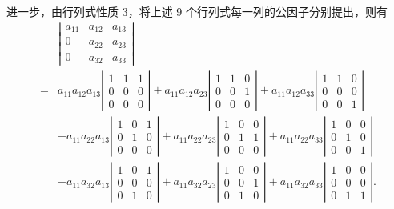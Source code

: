 \documentclass[UTF8,12pt,a4paper,fontset=fandol]{ctexart}
\begin{document}
进一步，由行列式性质 3，将上述 9 个行列式每一列的公因子分别提出，则有
\[
\begin{aligned}
&\left|\begin{array}{ccc}
a_{11} & a_{12} & a_{13}\\
0 & a_{22} & a_{23}\\
0 & a_{32} & a_{33}
\end{array}\right|\\
={}&
a_{11}a_{12}a_{13}\left|\begin{array}{ccc}1&1&1\\0&0&0\\0&0&0\end{array}\right|
+a_{11}a_{12}a_{23}\left|\begin{array}{ccc}1&1&0\\0&0&1\\0&0&0\end{array}\right|
+a_{11}a_{12}a_{33}\left|\begin{array}{ccc}1&1&0\\0&0&0\\0&0&1\end{array}\right|\\
&+a_{11}a_{22}a_{13}\left|\begin{array}{ccc}1&0&1\\0&1&0\\0&0&0\end{array}\right|
+a_{11}a_{22}a_{23}\left|\begin{array}{ccc}1&0&0\\0&1&1\\0&0&0\end{array}\right|
+a_{11}a_{22}a_{33}\left|\begin{array}{ccc}1&0&0\\0&1&0\\0&0&1\end{array}\right|\\
&+a_{11}a_{32}a_{13}\left|\begin{array}{ccc}1&0&1\\0&0&0\\0&1&0\end{array}\right|
+a_{11}a_{32}a_{23}\left|\begin{array}{ccc}1&0&0\\0&0&1\\0&1&0\end{array}\right|
+a_{11}a_{32}a_{33}\left|\begin{array}{ccc}1&0&0\\0&0&0\\0&1&1\end{array}\right|.
\end{aligned}
\]
\end{document}
